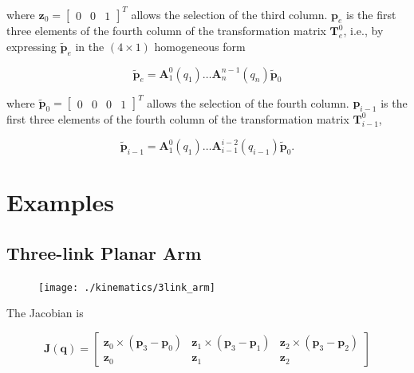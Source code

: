 \documentclass[10pt]{article}
\begin{document}
where $\boldsymbol{z}_{0}=\left[\begin{array}{lll}0 & 0 & 1\end{array}\right]^{T}$ allows the selection of the third column. $\boldsymbol{p}_{e}$ is the first three elements of the fourth column of the transformation matrix $\boldsymbol{T}_{e}^{0}$, i.e., by expressing $\widetilde{\boldsymbol{p}}_{e}$ in the $(4 \times 1)$ homogeneous form

  $$
\widetilde{\boldsymbol{p}}_{e}=\boldsymbol{A}_{1}^{0}\left(q_{1}\right) \ldots \boldsymbol{A}_{n}^{n-1}\left(q_{n}\right) \widetilde{\boldsymbol{p}}_{0}
$$

where $\widetilde{\boldsymbol{p}}_{0}=\left[\begin{array}{llll}0 & 0 & 0 & 1\end{array}\right]^{T}$ allows the selection of the fourth column.  $\boldsymbol{p}_{i-1}$ is  the first three elements of the fourth column of the transformation matrix $\boldsymbol{T}_{i-1}^{0}$, 

$$
\widetilde{\boldsymbol{p}}_{i-1}=\boldsymbol{A}_{1}^{0}\left(q_{1}\right) \ldots \boldsymbol{A}_{i-1}^{i-2}\left(q_{i-1}\right) \widetilde{\boldsymbol{p}}_{0} .
$$





\section{Examples}

\subsection{Three-link Planar Arm}



\begin{figure}[H]
    \centering
   \texttt{[image: ./kinematics/3link\_arm]}
    \label{c1.l2.three-link-robot-arm}
\end{figure}



The Jacobian is

$$
\boldsymbol{J}(\boldsymbol{q})=\left[\begin{array}{ccc}
\boldsymbol{z}_{0} \times\left(\boldsymbol{p}_{3}-\boldsymbol{p}_{0}\right) & \boldsymbol{z}_{1} \times\left(\boldsymbol{p}_{3}-\boldsymbol{p}_{1}\right) & \boldsymbol{z}_{2} \times\left(\boldsymbol{p}_{3}-\boldsymbol{p}_{2}\right) \\
\boldsymbol{z}_{0} & \boldsymbol{z}_{1} & \boldsymbol{z}_{2}
\end{array}\right]
$$
\end{document}
